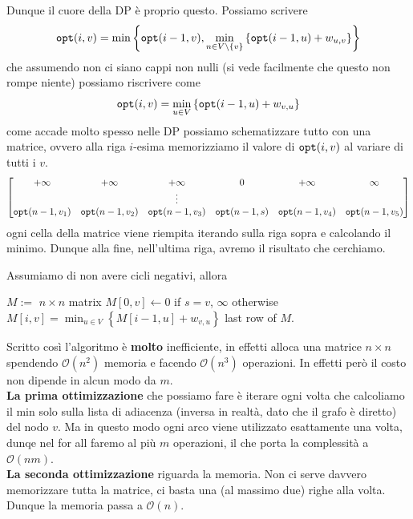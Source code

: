 \documentclass[11pt]{scrartcl}
\newcommand{\bigo}{\mathcal{O}}
\begin{document}
	Dunque il cuore della DP è proprio questo. Possiamo scrivere
	$$\verb|opt|(i,v)=\min\left\{\verb|opt|(i-1,v),\min_{n\in V\setminus\left\{v\right\}}\left\{\verb|opt|(i-1,u)+w_{u,v}\right\}\right\}$$
	che assumendo non ci siano cappi non nulli (si vede facilmente che questo non rompe niente) possiamo riscrivere come
	$$\verb|opt|(i,v)=\min_{u\in V}\left\{\verb|opt|(i-1,u)+w_{v,u}\right\}$$
	come accade molto spesso nelle DP possiamo schematizzare tutto con una matrice, ovvero alla riga $i$-esima memorizziamo il valore di $\verb|opt|(i,v)$ al variare di tutti i $v$.
	$$
	\begin{bmatrix}
		+\infty & +\infty & +\infty & 0 & +\infty & \infty  \\
		 		& 		  &   \vdots &  &         & \\
		 \verb|opt|(n-1,v_1) & \verb|opt|(n-1,v_2)	& \verb|opt|(n-1,v_3) & \verb|opt|(n-1,s) & \verb|opt|(n-1,v_4) & \verb|opt|(n-1,v_5)
	\end{bmatrix}
	$$
	ogni cella della matrice viene riempita iterando sulla riga sopra e calcolando il minimo. Dunque alla fine, nell'ultima riga, avremo il risultato che cerchiamo.
	\begin{algorithm}
		Assumiamo di non avere cicli negativi, allora
		\begin{algorithmic}[1]
				\State $M:=$ $n\times n$ matrix
				\State $M[0,v]\gets 0$ if $s=v$, $\infty$ otherwise
						\State $M[i,v]=\min_{u\in V}\left\{M[i-1,u]+w_{v,u}\right\}$
					\EndFor
				\EndFor
				\State \Return last row of $M$.
			\EndFunction
		\end{algorithmic}
	\end{algorithm}
	Scritto così l'algoritmo è \textbf{molto} inefficiente, in effetti alloca una matrice $n\times n$ spendendo $\bigo(n^2)$ memoria e facendo $\bigo(n^3)$ operazioni. In effetti però il costo non dipende in alcun modo da $m$. \\
	\textbf{La prima ottimizzazione} che possiamo fare è iterare ogni volta che calcoliamo il min solo sulla lista di adiacenza (inversa in realtà, dato che il grafo è diretto) del nodo $v$. Ma in questo modo ogni arco viene utilizzato esattamente una volta, dunqe nel for all faremo al più $m$ operazioni, il che porta la complessità a $\bigo(nm)$. \\
	\textbf{La seconda ottimizzazione} riguarda la memoria. Non ci serve davvero memorizzare tutta la matrice, ci basta una (al massimo due) righe alla volta. Dunque la memoria passa a $\bigo(n)$. \\
\end{document}
